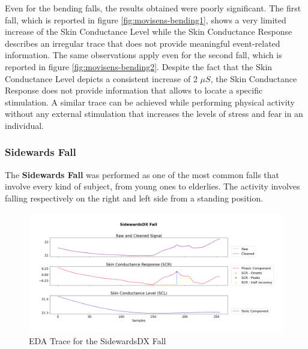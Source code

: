 \vspace{15mm}
Even for the bending falls, the results obtained were poorly significant. The first fall, which is reported in figure \ref{fig:movisens-bending1}, shows a very limited increase of the Skin Conductance Level while the Skin Conductance Response describes an irregular trace that does not provide meaningful event-related information. The same observations apply even for the second fall, which is reported in figure \ref{fig:movisens-bending2}. Despite the fact that the Skin Conductance Level depicts a consistent increase of 2 $\mu S$, the Skin Conductance Response does not provide information that allows to locate a specific stimulation. A similar trace can be achieved while performing physical activity without any external stimulation that increases the levels of stress and fear in an individual.

\newpage

\subsubsection{Sidewards Fall}\label{subsubsec:sidewards-fall}

The \textbf{Sidewards Fall} was performed as one of the most common falls that involve every kind of subject, from young ones to elderlies. The activity involves falling respectively on the right and left side from a standing position.

\begin{figure}[h!]
    \centering
    \includegraphics[width=\textwidth]{./images/movisens/SidewardsDX.png}
    \caption{EDA Trace for the SidewardsDX Fall}
    \label{fig:movisens-sidewardsdx}
\end{figure}

